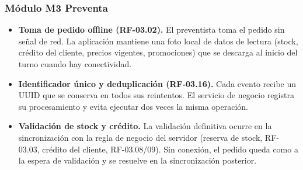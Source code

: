 \subsubsection*{Módulo M3 Preventa}
\begin{itemize}
  \item \textbf{Toma de pedido offline (RF-03.02).} El preventista toma el pedido sin señal de red. La aplicación mantiene una foto local de datos de lectura (stock, crédito del cliente, precios vigentes, promociones) que se descarga al inicio del turno cuando hay conectividad.
  \item \textbf{Identificador único y deduplicación (RF-03.16).} Cada evento recibe un UUID que se conserva en todos sus reintentos. El servicio de negocio registra su procesamiento y evita ejecutar dos veces la misma operación.
  \item \textbf{Validación de stock y crédito.} La validación definitiva ocurre en la sincronización con la regla de negocio del servidor (reserva de stock, RF-03.03, crédito del cliente, RF-03.08/09). Sin conexión, el pedido queda como a la espera de validación y se resuelve en la sincronización posterior.


\end{itemize}
